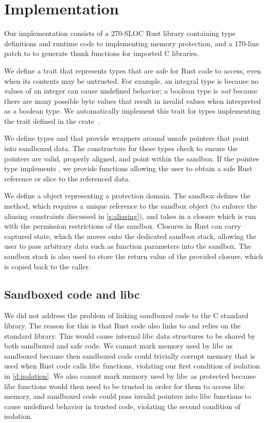 \chapter{Implementation}

Our implementation consists of a 270-SLOC Rust library containing type definitions and runtime code
to implementing memory protection, and a 170-line patch to  to generate thunk functions
for imported C libraries.

We define a trait  that represents types that are safe for Rust code to access, even
when its contents may be untrusted. For example, an integral type is  because no
values of an integer can cause undefined behavior; a boolean type is \textit{not} 
because there are many possible byte values that result in invalid values when interpreted as a
boolean type. We automatically implement this trait for types implementing the 
trait defined in the  crate~\cite{bytemuck:AnyBitPattern}.

We define types  and  that provide wrappers around unsafe pointers
that point into sandboxed data. The constructors for these types check to ensure the pointers are
valid, properly aligned, and point within the sandbox. If the pointee type implements
, we provide functions allowing the user to obtain a safe Rust reference or slice to
the referenced data.

We define a  object representing a protection domain. The sandbox defines the 
method, which requires a unique reference to the sandbox object (to enforce the aliasing constraints
discussed in \autoref{s:aliasing}), and takes in a closure which is run with the permission
restrictions of the sandbox. Closures in Rust can carry captured state, which the  moves
onto the dedicated sandbox stack, allowing the user to pass arbitrary data such as function
parameters into the sandbox. The sandbox stack is also used to store the return value of the
provided closure, which is copied back to the caller.

\section{Sandboxed code and libc}

We did not address the problem of linking sandboxed code to the C standard library. The reason for
this is that Rust code also links to and relies on the standard library. This would cause internal
libc data structures to be shared by both sandboxed and safe code. We cannot mark memory used by
libc as sandboxed because then sandboxed code could trivially corrupt memory that is used when Rust
code calls libc functions, violating our first condition of isolation in \autoref{d:isolation}. We
also cannot mark memory used by libc as protected because libc functions would then need to be
trusted in order for them to access libc memory, and sandboxed code could pass invalid pointers into
libc functions to cause undefined behavior in trusted code, violating the second condition of
isolation.

